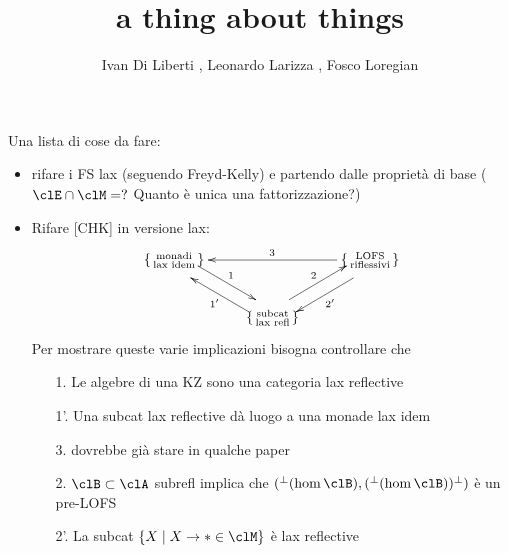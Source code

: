 \documentclass{amsart}
\title{a thing about things}
\author{
    Ivan Di Liberti
  , Leonardo Larizza
  , Fosco Loregian
}
\def\A{\protect{\{\begin{smallmatrix}
  \text{monadi}\\
  \text{lax idem}
\end{smallmatrix}\}}}
\def\B{\protect{\{\begin{smallmatrix}
  \text{LOFS}\\
  \text{riflessivi}
\end{smallmatrix}\} }}
\def\C{\protect{\{\begin{smallmatrix}
  \text{subcat}\\
  \text{lax refl}
\end{smallmatrix} \} }}
\begin{document}
\maketitle
Una lista di cose da fare:
\begin{itemize}
  \item rifare i FS lax (seguendo Freyd-Kelly) e partendo dalle proprietà di base ($\clE\cap \clM = ?$ Quanto è unica una fattorizzazione?)
  \item Rifare [CHK] in versione lax: 
  \[
  \xymatrix{
    \A \ar@<5pt>[dr]^1 && \ar[ll]_{3} \B \ar@<5pt>[dl]^{2'} \\
     & \C \ar@<5pt>[ur]^2 \ar@<5pt>[ul]^{1'} &
  }  
  \]  
  Per mostrare queste varie implicazioni bisogna controllare che
  \begin{itemize}
  \item[1.] Le algebre di una KZ sono una categoria lax reflective
  \item[1'.] Una subcat lax reflective dà luogo a una monade lax idem
  \item[3.] dovrebbe già stare in qualche paper
  \item[2.] $\clB\subset\clA$ subrefl implica che $({}^\perp(\hom \clB), ({}^\perp(\hom\clB))^\perp)$ è un pre-LOFS
  \item[2'.] La subcat $\{X \mid X \to * \in \clM\}$ è lax reflective
  \end{itemize}
\end{itemize}
\hrulefill
\end{document}
